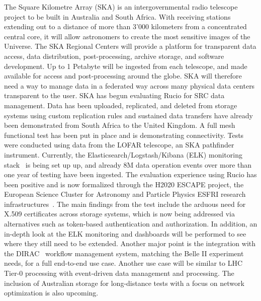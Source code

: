 \documentclass[11pt]{article}
\begin{document}
The Square Kilometre Array (SKA) is an intergovernmental radio telescope project to be built in Australia and South Africa. With receiving stations extending out to a distance of more than 3'000 kilometers from a concentrated central core, it will allow astronomers to create the most sensitive images of the Universe. The SKA Regional Centers will provide a platform for transparent data access, data distribution, post-processing, archive storage, and software development. Up to 1 Petabyte will be ingested from each telescope, and made available for access and post-processing around the globe. SKA will therefore need a way to manage data in a federated way across many physical data centers transparent to the user. SKA has begun evaluating Rucio for SRC data management. Data has been uploaded, replicated, and deleted from storage systems using custom replication rules and sustained data transfers have already been demonstrated from South Africa to the United Kingdom. A full mesh functional test has been put in place and is demonstrating connectivity. Tests were conducted using data from the LOFAR telescope, an SKA pathfinder instrument. Currently, the Elasticsearch/Logstash/Kibana (ELK) monitoring stack~\cite{elk} is being set up up, and already 8M data operation events over more than one year of testing have been ingested. The evaluation experience using Rucio has been positive and is now formalized through the H2020 ESCAPE project, the European Science Cluster for Astronomy and Particle Physics ESFRI research infrastructures~\cite{escape}. The main findings from the test include the arduous need for X.509 certificates across storage systems, which is now being addressed via alternatives such as token-based authentication and authorization. In addition, an in-depth look at the ELK monitoring and dashboards will be performed to see where they still need to be extended. Another major point is the integration with the DIRAC~\cite{dirac} workflow management system, matching the Belle II experiment needs, for a full end-to-end use case. Another use case will be similar to LHC Tier-0 processing with event-driven data management and processing. The inclusion of Australian storage for long-distance tests with a focus on network optimization is also upcoming.
\end{document}
